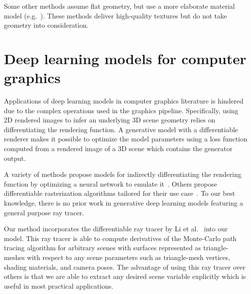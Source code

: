 Some other methods assume flat geometry, but use a more elaborate material model
(e.g.~\cite{barron2015sir, aittala2015two, deschaintre2018single}). These methods deliver
high-quality textures but do not take geometry into consideration.

\section{Deep learning models for computer graphics}

Applications of deep learning models in computer graphics literature is hindered due to the
complex operations used in the graphics pipeline. Specifically, using 2D rendered images to
infer an underlying 3D scene geometry relies on differentiating the rendering function.
A generative model with a differentiable renderer makes it possible to optimize the model
parameters using a loss function computed from a rendered image of a 3D scene which contains
the generator output. 

A variety of methods propose models for indirectly differentiating the rendering function
by optimizing a neural network to emulate
it~\cite{kulkarni2015deep, nguyen2018rendernet, nguyen2019hologan}. Others propose
differentiable rasterization algorithms tailored for their use
case~\cite{genova2018unsupervised, liu2019soft}. To our best knowledge, there is no prior
work in generative deep learning models featuring a general purpose ray tracer.

Our method incorporates the differentiable ray tracer by Li et
al.~\cite{li2018differentiable} into our model. This ray tracer is able to compute
derivatives of the Monte-Carlo path tracing algorithm for arbitrary scenes with surfaces
represented as triangle-meshes with respect to any scene parameters such as triangle-mesh
vertices, shading materials, and camera poses. The advantage of using this ray tracer over
others is that we are able to extract any desired scene variable explicitly which is useful
in most practical applications.
